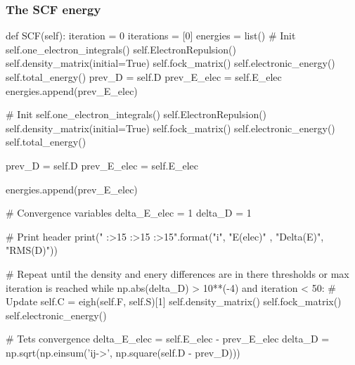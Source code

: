 \documentclass{beamer}
\begin{document}
\begin{frame}[fragile]
    \frametitle{The SCF energy}
    \begin{python}
def SCF(self):
    iteration = 0
    iterations = [0]
    energies = list()
    # Init
    self.one_electron_integrals()
    self.ElectronRepulsion()
    self.density_matrix(initial=True)
    self.fock_matrix()
    self.electronic_energy()
    self.total_energy()
    prev_D = self.D
    prev_E_elec = self.E_elec
    energies.append(prev_E_elec)
    \end{python}
\end{frame}
\begin{frame}[fragile]
    \begin{python}
   
        # Init
        self.one_electron_integrals()
        self.ElectronRepulsion()
        self.density_matrix(initial=True)
        self.fock_matrix()
        self.electronic_energy()
        self.total_energy()

        prev_D = self.D
        prev_E_elec = self.E_elec
        
        energies.append(prev_E_elec)
    \end{python}
\end{frame}
\begin{frame}[fragile]
    \begin{python}
        # Convergence variables
        delta_E_elec = 1
        delta_D = 1
        
        # Print header
        print("{} {:>15} {:>15} {:>15}".format("i", "E(elec)" , "Delta(E)", "RMS(D)"))
    \end{python}
\end{frame}
\begin{frame}[fragile]
    \begin{python} 
        # Repeat until the density and enery differences are in there thresholds or max iteration is reached
        while np.abs(delta_D) > 10**(-4) and iteration < 50:
            # Update
            self.C = eigh(self.F, self.S)[1]
            self.density_matrix()
            self.fock_matrix()
            self.electronic_energy()
        \end{python}
    \end{frame}
    \begin{frame}[fragile]
        \begin{python}
             # Tets convergence
            delta_E_elec = self.E_elec - prev_E_elec
            delta_D = np.sqrt(np.einsum('ij->', np.square(self.D - prev_D)))
        \end{python}
    \end{frame}
\end{document}
